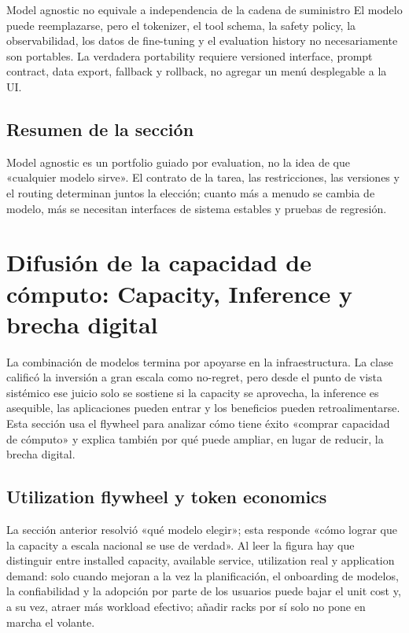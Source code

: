 \documentclass[a4paper]{article}
\begin{document}
\begin{warningbox}{Model agnostic no equivale a independencia de la cadena de suministro}
El modelo puede reemplazarse, pero el tokenizer, el tool schema, la safety policy, la observabilidad, los datos de fine-tuning y el evaluation history no necesariamente son portables. La verdadera portability requiere versioned interface, prompt contract, data export, fallback y rollback, no agregar un menú desplegable a la UI.
\end{warningbox}


\subsection{Resumen de la sección}

Model agnostic es un portfolio guiado por evaluation, no la idea de que «cualquier modelo sirve». El contrato de la tarea, las restricciones, las versiones y el routing determinan juntos la elección; cuanto más a menudo se cambia de modelo, más se necesitan interfaces de sistema estables y pruebas de regresión.
\section{Difusión de la capacidad de cómputo: Capacity, Inference y brecha digital}

La combinación de modelos termina por apoyarse en la infraestructura. La clase calificó la inversión a gran escala como no-regret, pero desde el punto de vista sistémico ese juicio solo se sostiene si la capacity se aprovecha, la inference es asequible, las aplicaciones pueden entrar y los beneficios pueden retroalimentarse. Esta sección usa el flywheel para analizar cómo tiene éxito «comprar capacidad de cómputo» y explica también por qué puede ampliar, en lugar de reducir, la brecha digital.

\subsection{Utilization flywheel y token economics}

La sección anterior resolvió «qué modelo elegir»; esta responde «cómo lograr que la capacity a escala nacional se use de verdad». Al leer la figura hay que distinguir entre installed capacity, available service, utilization real y application demand: solo cuando mejoran a la vez la planificación, el onboarding de modelos, la confiabilidad y la adopción por parte de los usuarios puede bajar el unit cost y, a su vez, atraer más workload efectivo; añadir racks por sí solo no pone en marcha el volante.
\end{document}
